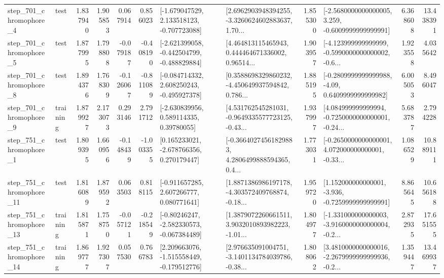 \begin{tabular}{llrrrrllrlrr}
   step\_701\_chromophore\_4 &      test &      1.837940 &    1.905853 &      0.067914 &  0.856023 &   [-1.679047529, 2.133518123, -0.707723088] &  [2.6962903948394255, -3.3260624602883637, 1.70... &       1.855300 &  [-2.5680000000000005, 3.259, -0.6009999999999991] &            6.368608 &         13.438391 \\
   step\_701\_chromophore\_5 &      test &      1.877995 &    1.798808 &     -0.079187 & -0.408190 &  [-2.621399058, -0.442504799, -0.488829884] &  [4.464813115465943, 0.444464671336002, 0.96514... &       1.903957 &  [-4.123999999999999, -0.5990000000000002, -0.6... &            1.923558 &          4.035642 \\
   step\_701\_chromophore\_8 &      test &      1.894376 &    1.768309 &     -0.126067 & -0.811089 &   [-0.084714332, 2.608250243, -0.495927378] &  [0.3588698329860232, -4.450649937594842, 0.786... &       1.885195 &   [-0.2809999999999988, -4.09, 0.6409999999999982] &            6.005053 &          8.496047 \\
   step\_701\_chromophore\_9 &  training &      1.879927 &    2.173073 &      0.293146 &  2.791712 &     [-2.630839956, 0.589114335, 0.39780055] &  [4.531762545281031, -0.9649335577723125, -0.43... &       1.937997 &  [4.084999999999994, -0.7250000000000001, -0.24... &            5.683787 &          2.794228 \\
   step\_751\_chromophore\_1 &      test &      1.809395 &    1.660956 &     -0.148439 & -1.003355 &    [0.165233021, -2.678766356, 0.270179447] &  [-0.36640274561829883, 4.2806499888594365, 0.4... &       1.773031 &  [-0.2650000000000001, 4.072000000000001, -0.33... &            1.086529 &         10.889111 \\
  step\_751\_chromophore\_11 &      test &      1.816089 &    1.879592 &      0.063503 &  0.818115 &    [-0.911657285, 2.607266777, 0.080771641] &  [1.8871386986197178, -4.303572409768874, -0.18... &       1.959720 &   [1.152000000000001, -3.936, -0.7259999999999991] &            8.865645 &         10.656188 \\
  step\_751\_chromophore\_13 &  training &      1.815871 &    1.758750 &     -0.057121 & -0.218549 &   [-0.80246247, -2.582330573, -0.067384489] &  [1.3879072260661511, 3.9032010893982223, -1.01... &       1.804977 &  [-1.331000000000003, -3.9160000000000004, -0.2... &            2.872935 &         17.651555 \\
  step\_751\_chromophore\_14 &  training &      1.869777 &    1.927307 &      0.057530 &  0.766783 &   [2.209663076, -1.515558449, -0.179512776] &  [2.976635091004751, -3.1401134784039786, -0.38... &       1.808062 &  [3.4810000000000016, -2.2679999999999936, -0.2... &            1.359447 &         13.469937 \\

\end{tabular}
